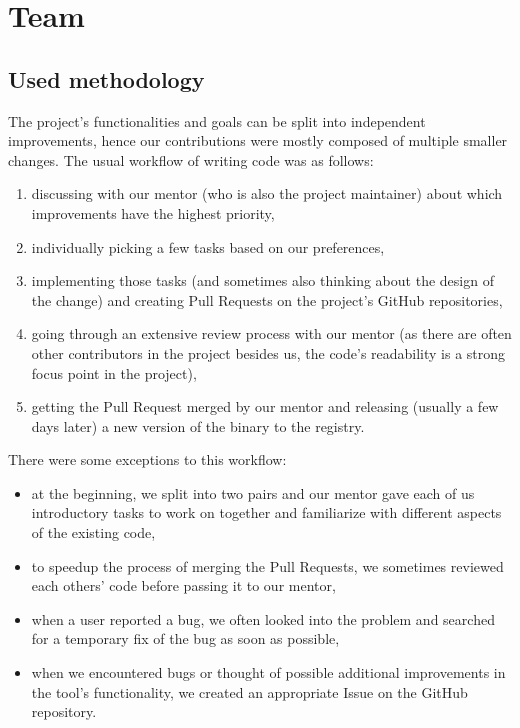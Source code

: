 \documentclass[licencjacka,en]{pracamgr}
\begin{document}
\chapter{Team}\label{r:chapter_team}

\section{Used methodology}

The project's functionalities and goals can be split into independent improvements,
hence our contributions were mostly composed of multiple smaller changes.
The usual workflow of writing code was as follows:
\begin{enumerate}
	\item discussing with our mentor (who is also the project maintainer) about
		which improvements have the highest priority,
	\item individually picking a few tasks based on our preferences,
	\item implementing those tasks
		(and sometimes also thinking about the design of the change)
		and creating Pull Requests
		on the project's GitHub repositories,
	\item going through an extensive review process with our mentor
		(as there are often other contributors in the project besides us,
		the code's readability is a strong focus point in the project),
	\item getting the Pull Request merged by our mentor
		and releasing (usually a few days later) a new version of the binary to the registry.
\end{enumerate}

There were some exceptions to this workflow:
\begin{itemize}
	\item at the beginning, we split into two pairs and our mentor gave each of us
		introductory tasks to work on together and familiarize with different aspects of the existing code,
	\item to speedup the process of merging the Pull Requests,
		we sometimes reviewed each others' code before passing it to our mentor,
	\item when a user reported a bug, we often looked into the problem
		and searched for a temporary fix of the bug as soon as possible,
	\item when we encountered bugs or thought of possible additional improvements
		in the tool's functionality,
		we created an appropriate Issue on the GitHub repository.
\end{itemize}
\end{document}

